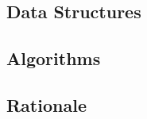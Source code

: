\subsection{Data Structures}
	\subsubsection{}
\subsection{Algorithms}
	\subsubsection{}
	\subsubsection{}
	\subsubsection{}
\subsection{Rationale}
	\subsubsection{}
	\subsubsection{}